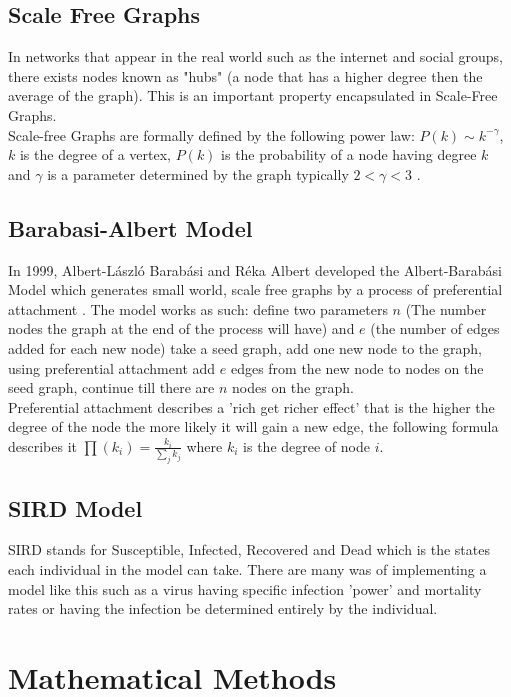 \documentclass{article}
\begin{document}
        \subsection{Scale Free Graphs}
        In networks that appear in the real world such as the internet and social groups, there exists nodes known as "hubs" (a node that has a higher degree then the average of the graph). This is an important property encapsulated in Scale-Free Graphs.\\ 
        Scale-free Graphs are formally defined by the following power law: $P(k) \sim  k^{-\gamma }$, $k$ is the degree of a vertex, $P(k)$ is the probability of a node having degree $k$ and $\gamma$ is a parameter determined by the graph typically $2<\gamma<3$ \parencite{onnela2007structure}.

        \subsection{Barabasi-Albert Model}
        In 1999, Albert-László Barabási and Réka Albert developed the Albert-Barabási Model which generates small world, scale free graphs by a process of preferential attachment \parencite{barabasi1999emergence}. The model works as such: define two parameters $n$ (The number nodes the graph at the end of the process will have) and $e$ (the number of edges added for each new node) take a seed graph, add one new node to the graph, using preferential attachment add $e$ edges from the new node to nodes on the seed graph, continue till there are $n$ nodes on the graph.\\
        Preferential attachment describes a 'rich get richer effect' that is the higher the degree of the node the more likely it will gain a new edge, the following formula describes it $\prod (k_{i}) = \frac{k_{i}}{\sum_{j} {k_{j}}}$ where $k_{i}$ is the degree of node $i$. 
        \subsection{SIRD Model}
        SIRD stands for Susceptible, Infected, Recovered and Dead which is the states each individual in the model can take. There are many was of implementing a model like this such as a virus having specific infection 'power' and mortality rates or having the infection be determined entirely by the individual.
    \section{Mathematical Methods}
\end{document}
